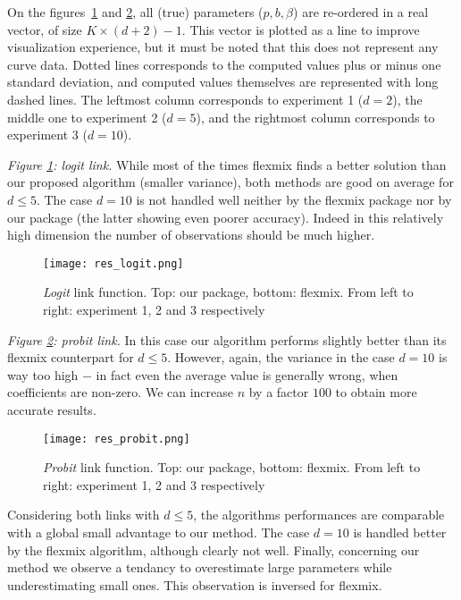 On the figures~\ref{res_logit} and \ref{res_probit}, all (true) parameters ($p, b, \beta$) are re-ordered in a real vector, of size $K \times (d+2) - 1$. This vector is plotted as a line to improve visualization experience, but it must be noted that this does not represent any curve data. Dotted lines corresponds to the computed values plus or minus one standard deviation, and computed values themselves are represented with long dashed lines. The leftmost column corresponds to experiment 1 ($d=2$), the middle one to experiment 2 ($d=5$), and the rightmost column corresponds to experiment 3 ($d=10$).




\noindent \textit{Figure \ref{res_logit}: logit link.}
While most of the times flexmix finds a better solution than our proposed algorithm (smaller variance), both methods are good on average for $d \leq 5$.
The case $d=10$ is not handled well neither by the flexmix package nor by our package (the latter showing even poorer accuracy).
Indeed in this relatively high dimension the number of observations should be much higher. 

\begin{figure}[!!ht!!]
\centering
	\texttt{[image: res\_logit.png]}
	\caption{\textit{Logit} link function. Top: our package, bottom: flexmix. From left to right: experiment 1, 2 and 3 respectively}
	\label{res_logit}
\end{figure}
\noindent \textit{Figure \ref{res_probit}: probit link.}
In this case our algorithm performs slightly better than its flexmix counterpart for $d \leq 5$.
However, again, the variance in the case $d=10$ is way too high $-$ in fact even the average value is generally wrong, when coefficients are non-zero.
We can increase $n$ by a factor $100$ to obtain more accurate results.\\
\begin{figure}[!!ht!!]
\centering
	\texttt{[image: res\_probit.png]}
	\caption{\textit{Probit} link function. Top: our package, bottom: flexmix. From left to right: experiment 1, 2 and 3 respectively}
	\label{res_probit}
\end{figure}




Considering both links with $d \leq 5$, the algorithms performances are comparable with a global small advantage to our method.
The case $d=10$ is handled better by the flexmix algorithm, although clearly not well.
Finally, concerning our method we observe a tendancy to overestimate large parameters while underestimating small ones.
This observation is inversed for flexmix.\\

